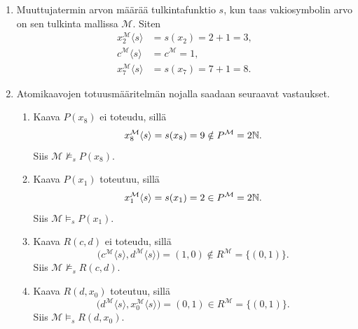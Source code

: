 \documentclass[11pt,a4paper]{amsart}
\begin{document}
\begin{solution}
  \leavevmode\par
  \begin{enumerate}[label=(\alph*)]
    \item Muuttujatermin arvon määrää tulkintafunktio \(s\), kun taas
      vakiosymbolin arvo on sen tulkinta mallissa \(\mathcal M\). Siten
      \[
        \begin{aligned}
          x_2^{\mathcal M}\langle s\rangle &= s(x_2) = 2 + 1 = 3, \\
          c^{\mathcal M}\langle s\rangle &= c^{\mathcal M} = 1, \\
          x_7^{\mathcal M}\langle s\rangle &= s(x_7) = 7 + 1 = 8.
        \end{aligned}
      \]

    \item Atomikaavojen totuusmääritelmän nojalla saadaan seuraavat
      vastaukset.
      \begin{enumerate}[label=(\alph*)]
        \item Kaava \(P(x_8)\) ei toteudu, sillä
          \[
            x_8^{\mathcal M}\langle s\rangle = s(x_8) = 9
            \notin P^{\mathcal M} = 2\mathbb{N}.
          \]
          Siis \(\mathcal M \not\models_s P(x_8)\).

        \item Kaava \(P(x_1)\) toteutuu, sillä
          \[
            x_1^{\mathcal M}\langle s\rangle = s(x_1) = 2
            \in P^{\mathcal M} = 2\mathbb{N}.
          \]
          Siis \(\mathcal M \models_s P(x_1)\).

        \item Kaava \(R(c,d)\) ei toteudu, sillä
          \[
            \bigl(c^{\mathcal M}\langle s\rangle,
            d^{\mathcal M}\langle s\rangle\bigr)
            = (1,0) \notin R^{\mathcal M} = \{(0,1)\}.
          \]
          Siis \(\mathcal M \not\models_s R(c,d)\).

        \item Kaava \(R(d,x_0)\) toteutuu, sillä
          \[
            \bigl(d^{\mathcal M}\langle s\rangle,
            x_0^{\mathcal M}\langle s\rangle\bigr)
            = (0,1) \in R^{\mathcal M} = \{(0,1)\}.
          \]
          Siis \(\mathcal M \models_s R(d,x_0)\).\qedhere
      \end{enumerate}
  \end{enumerate}
\end{solution}
\end{document}
